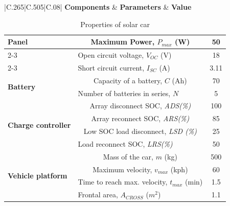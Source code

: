 \documentclass[journal]{IEEEtran/IEEEtran}
\begin{document}
	\begin{table}[!t]
		\renewcommand{\arraystretch}{1.3}
		\caption{Properties of solar car}
		\label{bat_table}
		\centering
		\begin{tabular}{|C{.265\columnwidth}|C{.505\columnwidth}|C{.08\columnwidth}| }
			\hline
			\centering
			\textbf{Components} & \textbf{Parameters} & \textbf{Value} \\ \hline
		\end{tabular}
		\begin{tabular}{|p{2.35cm}|c|c|}
			\multirow{3}{*}{\textbf{Panel\cite{srea}}}
			& \multicolumn{1}{L{.5\columnwidth}|}{Maximum Power, $P_{max}$ (W)} & \multicolumn{1}{c|}{50} \\\cline{2-3}
			& \multicolumn{1}{l|}{Open circuit voltage, $V_{OC}$ (V)} & \multicolumn{1}{c|}{18} \\\cline{2-3}
			& \multicolumn{1}{l|}{Short circuit current, $I_{SC}$ (A)} & \multicolumn{1}{c|}{3.11} \\\hline
			
			\multirow{2}{*}{\textbf{Battery\cite{sadia}}}
			& \multicolumn{1}{L{.5\columnwidth}|}{Capacity of a battery, $C$ (Ah)} & \multicolumn{1}{c|}{70} \\\cline{2-3}
			& \multicolumn{1}{l|}{Number of batteries in series, $N$ } & \multicolumn{1}{C{0.7cm}|}{5} \\\hline
			
			\multirow{4}{*}{\textbf{Charge controller}}
			& \multicolumn{1}{L{.5\columnwidth}|}{Array disconnect SOC, \textit{ADS(\%)}} & \multicolumn{1}{c|}{100} \\\cline{2-3}
			& \multicolumn{1}{L{.5\columnwidth}|}{Array reconnect SOC, \textit{ARS(\%)} } & \multicolumn{1}{c|}{85} \\\cline{2-3}
			& \multicolumn{1}{L{.5\columnwidth}|}{Low SOC load disconnect, \textit{LSD (\%)}} & \multicolumn{1}{c|}{25} \\\cline{2-3}
			& \multicolumn{1}{l|}{Load reconnect SOC, \textit{LRS(\%)}} & \multicolumn{1}{c|}{50} \\\hline
			
			\multirow{4}{*}{\textbf{Vehicle platform\cite{srea}}}
			& \multicolumn{1}{L{.5\columnwidth}|}{Mass of the car, $m$ (kg)} & \multicolumn{1}{c|}{500} \\\cline{2-3}
			& \multicolumn{1}{L{.5\columnwidth}|}{Maximum velocity, $v_{max}$ (kph)} & \multicolumn{1}{c|}{60} \\\cline{2-3}
			& \multicolumn{1}{L{.5\columnwidth}|}{Time to reach max. velocity, $t_{max}$ (min)} & \multicolumn{1}{c|}{1.5} \\\cline{2-3}
			& \multicolumn{1}{l|}{Frontal area, $A_\mathit{CROSS}$ ($m^2$)} & \multicolumn{1}{c|}{1.1} \\\hline
			

\end{tabular}
\end{table}
\end{document}
